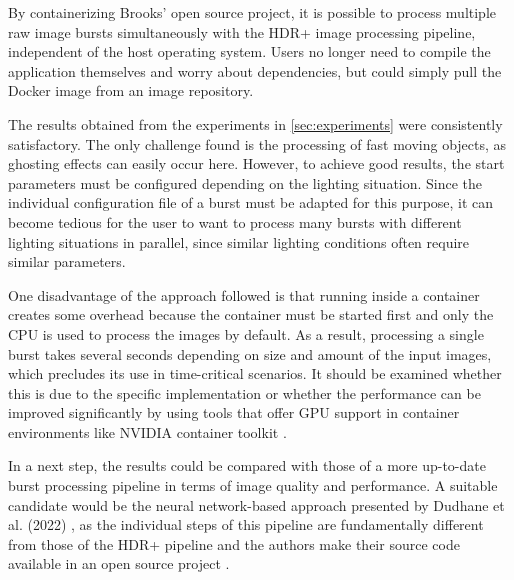\documentclass{egpubl}
\begin{document}
By containerizing Brooks' \cite{Brooks2016git} open source project, it is possible 
to process multiple raw image bursts simultaneously with the HDR+ 
image processing pipeline, independent of the host operating system. Users no 
longer need to compile the application themselves and worry about dependencies, 
but could simply pull the Docker image from an image repository.

The results obtained from the experiments in \cref{sec:experiments} were consistently 
satisfactory. The only challenge found is the processing of fast moving objects, as 
ghosting effects can easily occur here. However, to achieve good results, the start parameters must be configured depending 
on the lighting situation. Since the individual configuration file of a burst must 
be adapted for this purpose, it can become tedious for the user to want to process
many bursts with different lighting situations in parallel, since similar lighting 
conditions often require similar parameters.

One disadvantage of the approach followed is that running inside a container creates 
some overhead because the container must be started first and only the CPU is used 
to process the images by default. As a result, processing a single burst takes several seconds
depending on size and amount of the input images, which precludes its use in time-critical scenarios. 
It should be examined whether this is due to the specific implementation or whether the performance 
can be improved significantly by using tools that offer GPU support in container environments 
like NVIDIA container toolkit \cite{nvidia2015docker}.

In a next step, the results could be compared with those of a more up-to-date burst processing 
pipeline in terms of image quality and performance. A suitable candidate would be the neural 
network-based approach presented by Dudhane et al. (2022) \cite{Dudhane2022restoration}, 
as the individual steps of this pipeline are fundamentally different from those of the 
HDR+ pipeline and the authors make their source code available in an open source project
\cite{Dudhane2022git}.

%


\end{document}
